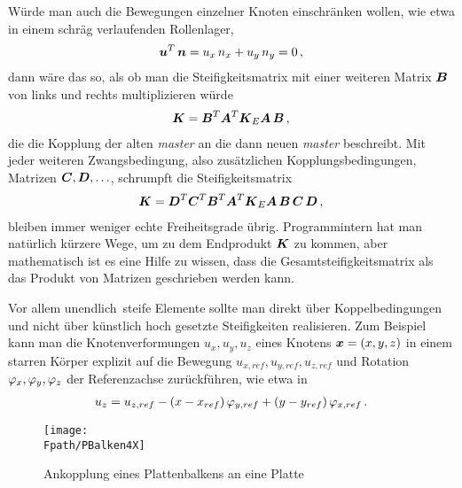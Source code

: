 W\"{u}rde man auch die Bewegungen einzelner Knoten einschr\"{a}nken wollen, wie etwa in einem schr\"{a}g verlaufenden Rollenlager,
\begin{align}
\mbox{\boldmath $u$}^T\,\mbox{\boldmath $n$} = u_x\,n_x + u_y\,n_y = 0\,,
\end{align}
dann w\"{a}re das so, als ob man die Steifigkeitsmatrix mit einer weiteren Matrix $\mbox{\boldmath $B$} $ von links und rechts multiplizieren w\"{u}rde
\begin{align}
\mbox{\boldmath $K$} = \mbox{\boldmath $B$}^T\mbox{\boldmath $A$}^T\mbox{\boldmath $K$}_E\mbox{\boldmath $A$}\,\mbox{\boldmath $B$} \,,
\end{align}
die die Kopplung der alten {\em master\/} an die dann neuen {\em master\/} beschreibt. Mit jeder weiteren Zwangsbedingung, also zus\"{a}tzlichen Kopplungsbedingungen, Matrizen $\mbox{\boldmath $C$}, \mbox{\boldmath $D$}, \ldots $, schrumpft die Steifigkeitsmatrix
\begin{align}
\mbox{\boldmath $K$} = \mbox{\boldmath $D$}^T \mbox{\boldmath $C$}^T\mbox{\boldmath $B$}^T\mbox{\boldmath $A$}^T \mbox{\boldmath $K$}_E\mbox{\boldmath $A$}\,\mbox{\boldmath $B$} \,\mbox{\boldmath $C$}\, \mbox{\boldmath $D$}\,,
\end{align}
bleiben immer weniger echte Freiheitsgrade \"{u}brig. Programmintern hat man nat\"{u}rlich k\"{u}rzere Wege, um zu dem Endprodukt $\mbox{\boldmath $K$}$ zu kommen, aber mathematisch ist es eine Hilfe zu wissen, dass die Gesamtsteifigkeitsmatrix als das Produkt von Matrizen geschrieben werden kann.

Vor allem \glq unendlich\grq\ steife Elemente sollte man direkt \"{u}ber Koppelbedingungen und nicht \"{u}ber k\"{u}nstlich hoch gesetzte Steifigkeiten realisieren. Zum Beispiel kann man die Knotenverformungen $u_x, u_y, u_z$ eines Knotens $\mbox{\boldmath $x$} = (x,y,z)$ in einem starren K\"{o}rper explizit auf die Bewegung $u_{x,ref},u_{y,ref},u_{z,ref}$ und Rotation $\varphi_x, \varphi_y, \varphi_z$ der Referenzachse zur\"{u}ckf\"{u}hren, wie etwa in
\begin{align}
u_z = u_{z,ref} - ( x - x_{ref})\,\varphi_{y,ref} + (y - y_{ref})\, \varphi_{x,ref}\,.
\end{align}

\begin{figure}[tbp] \centering
\if {} \sidecaption \fi
\texttt{[image: \\Fpath/PBalken4X]}
\caption{Ankopplung eines Plattenbalkens an eine Platte} \label{PBalken4}
\end{figure}%

